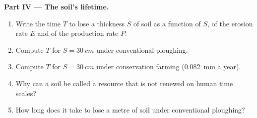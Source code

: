 \begin{problem}
\medskip
\noindent\textbf{Part IV --- The soil's lifetime.}
\begin{enumerate}[resume]
  \item Write the time $T$ to lose a thickness $S$ of soil as a function of
        $S$, of the erosion rate $E$ and of the production rate $P$.
  \item Compute $T$ for $S = \qty{30}{cm}$ under conventional ploughing.
  \item Compute $T$ for $S = \qty{30}{cm}$ under conservation farming
        (\qty{0.082}{mm} a year).
  \item Why can a soil be called a resource that is not renewed on human
        time scales?
  \item How long does it take to lose a metre of soil under conventional
        ploughing?
\end{enumerate}
\end{problem}
